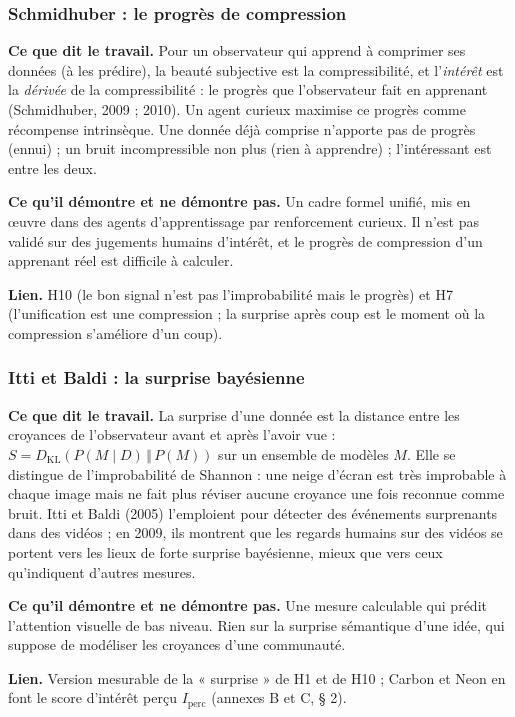 \documentclass[a4paper,11pt]{article}
\newcommand{\cours}[1]{\par\smallskip\textbf{\textsf{#1}}\enspace}
\begin{document}
\subsubsection{Schmidhuber : le progrès de compression}
\cours{Ce que dit le travail.} Pour un observateur qui apprend à comprimer ses données (à les prédire), la beauté subjective est la compressibilité, et l'\emph{intérêt} est la \emph{dérivée} de la compressibilité : le progrès que l'observateur fait en apprenant (Schmidhuber, 2009 ; 2010). Un agent curieux maximise ce progrès comme récompense intrinsèque. Une donnée déjà comprise n'apporte pas de progrès (ennui) ; un bruit incompressible non plus (rien à apprendre) ; l'intéressant est entre les deux.
\cours{Ce qu'il démontre et ne démontre pas.} Un cadre formel unifié, mis en œuvre dans des agents d'apprentissage par renforcement curieux. Il n'est pas validé sur des jugements humains d'intérêt, et le progrès de compression d'un apprenant réel est difficile à calculer.
\cours{Lien.} H10 (le bon signal n'est pas l'improbabilité mais le progrès) et H7 (l'unification est une compression ; la surprise après coup est le moment où la compression s'améliore d'un coup).

\subsubsection{Itti et Baldi : la surprise bayésienne}
\cours{Ce que dit le travail.} La surprise d'une donnée est la distance entre les croyances de l'observateur avant et après l'avoir vue : $S=D_{\mathrm{KL}}(P(M\mid D)\,\Vert\,P(M))$ sur un ensemble de modèles $M$. Elle se distingue de l'improbabilité de Shannon : une neige d'écran est très improbable à chaque image mais ne fait plus réviser aucune croyance une fois reconnue comme bruit. Itti et Baldi (2005) l'emploient pour détecter des événements surprenants dans des vidéos ; en 2009, ils montrent que les regards humains sur des vidéos se portent vers les lieux de forte surprise bayésienne, mieux que vers ceux qu'indiquent d'autres mesures.
\cours{Ce qu'il démontre et ne démontre pas.} Une mesure calculable qui prédit l'attention visuelle de bas niveau. Rien sur la surprise sémantique d'une idée, qui suppose de modéliser les croyances d'une communauté.
\cours{Lien.} Version mesurable de la « surprise » de H1 et de H10 ; Carbon et Neon en font le score d'intérêt perçu $I_{\text{perc}}$ (annexes B et C, § 2).
\end{document}
